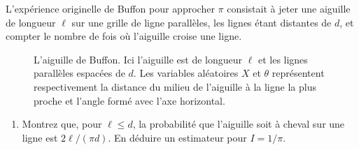 \documentclass[11pt]{td_um}
\begin{document}
\begin{exo}{} %
    L'expérience originelle de Buffon pour approcher $\pi$ consistait à jeter une aiguille de longueur
    $\ell$ sur une grille de ligne parallèles, les lignes étant distantes de
    $d$, et compter le nombre de fois où l'aiguille croise une ligne.
    \begin{figure}[h!]
        \centering
        \caption{L'aiguille de Buffon. Ici l'aiguille est de longueur $\ell$
            et les lignes parallèles espacées de $d$. Les variables aléatoires
            $X$ et $\theta$ représentent respectivement la distance du milieu
            de l'aiguille à la ligne la plus proche et l'angle formé avec
        l'axe horizontal.}
        \label{fig:buffon}
    \end{figure}
    \begin{enumerate}
        \item Montrez que, pour $\ell \leq d$, la probabilité que l'aiguille soit à cheval sur une ligne est
            $2 \ell / (\pi d)$. En déduire un estimateur pour
            $I= 1 / \pi$. 
\end{enumerate}
\end{exo}
\end{document}
